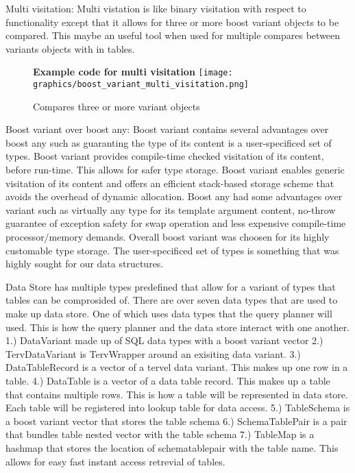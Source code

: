\documentclass[letterpaper, 12pt]{article}
\begin{document}
Multi visitation:
Multi vistation is like binary visitation with respect to functionality except that it allows for
three or more boost variant objects to be compared. This maybe an useful tool when used for
multiple compares between variants objects with in tables.

\begin{figure}
  \centering
  \textbf{Example code for multi visitation}
  \texttt{[image: graphics/boost\_variant\_multi\_visitation.png]}
  \cite{boostvariant}
  \caption{Compares three or more variant objects}
\end{figure}

Boost variant over boost any:
Boost variant contains several advantages over boost any such as guaranting the type of its
content is a user-specificed set of types. Boost variant provides compile-time checked
visitation of its content, before run-time. This allows for safer type storage. Boost variant
enables generic visitation of its content and offers an efficient stack-based storage scheme
that avoids the overhead of dynamic allocation. Boost any had some advantages over variant such
as virtually any type for its template argument content, no-throw guarantee of exception safety
for swap operation and less expensive compile-time processor/memory demands. Overall boost
variant was choosen for its highly customable type storage. The user-specificed set of types
is something that was highly sought for our data structures.
\par\vspace{\baselineskip}

	Data Store has multiple types predefined that allow for a variant of types that tables can be
	comprosided of. There are over seven data types that are used to make up data store. One of which
	uses data types that the query planner will used. This is how the query planner and the data store
	interact with one another.
1.) DataVariant made up of SQL data types with a boost variant vector
2.)	TervDataVariant is TervWrapper around an exisiting data variant.
3.)	DataTableRecord is a vector of a tervel data variant. This makes up one row in
	a table.
4.)	DataTable is a vector of a data table record. This makes up a table that contains multiple rows.
	This is how a table will be represented in data store. Each table will be registered into lookup table
	for data access.
5.)	TableSchema is a boost variant vector that stores the table schema
6.)	SchemaTablePair is a pair that bundles table nested vector with the table schema
7.)	TableMap is a hashmap that stores the location of schematablepair with the table name. This
	allows for easy fast instant access retrevial of tables.
\end{document}
